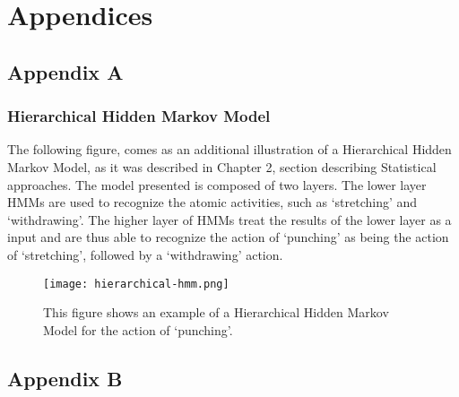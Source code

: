 \documentclass[11pt]{report}
\begin{document}
\clearpage

\chapter*{Appendices}
\section{Appendix A}

\subsection{Hierarchical Hidden Markov Model}
The following figure, comes as an additional illustration of a Hierarchical Hidden Markov Model, as it was described in Chapter 2, section describing Statistical approaches. The model presented is composed of two layers. The lower layer HMMs are used to recognize the atomic activities, such as `stretching' and `withdrawing'. The higher layer of HMMs treat the results of the lower layer as a input and are thus able to recognize the action of `punching' as being the action of `stretching', followed by a `withdrawing' action. 

\begin{figure}[p]
    \centering
    \texttt{[image: hierarchical-hmm.png]}
    \caption{This figure shows an example of a Hierarchical Hidden Markov Model for the action of `punching'.}
    \label{fig:hierarchical-hmm}
\end{figure}

\section{Appendix B}

\clearpage
\end{document}
